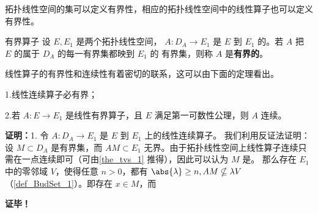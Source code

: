 
\begin{issues}
\issueDraft
\end{issues}

拓扑线性空间的集可以定义有界性，相应的拓扑线性空间中的线性算子也可以定义有界性。

\begin{definition}{有界算子}
设 $E,E_1$ 是两个拓扑线性空间， $A:D_A\rightarrow E_1$ 是 $E$ 到 $E_1$ 的。若 $A$ 把 $E$ 的属于 $D_A$ 的每一有界集都映到 $E_1$ 的 有界集，则称 $A$ 是\textbf{有界的}。
\end{definition}

线性算子的有界性和连续性有着密切的联系，这可以由下面的定理看出。

\begin{theorem}{}
1.线性连续算子必有界；

2.若 $A:E\rightarrow E_1$ 是线性有界算子，且 $E$ 满足第一可数性公理，则 $A$ 连续。
\end{theorem}
\textbf{证明：}1. 令 $A:D_A\rightarrow E_1$ 是 $E$ 到 $E_1$ 上的线性连续算子。 我们利用反证法证明：设 $M\subset D_A$ 是有界集，而 $AM\subset E_1$ 无界。由于拓扑线性空间上线性算子连续只需在一点连续即可（可由\autoref{the_tvs_1} 推得），因此可以认为 $M$ 是。 那么存在 $E_1$ 中的零邻域 $V$，使得任意 $n>0$，都有 $\abs{\lambda}\geq n,AM\nsubseteq\lambda V$ （\autoref{def_BudSet_1}）。即存在 $x\in M$，而 $$


\textbf{证毕！}


